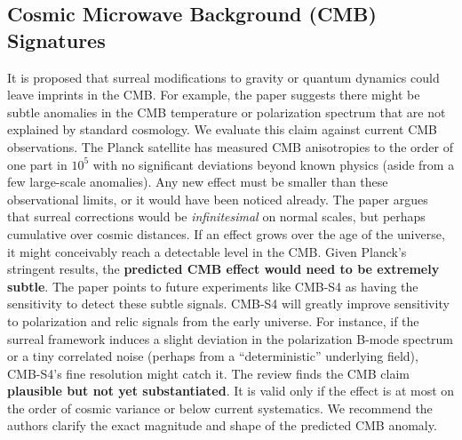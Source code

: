 \documentclass{article}
\begin{document}
\subsection*{Cosmic Microwave Background (CMB) Signatures}
It is proposed that surreal modifications to gravity or quantum dynamics could leave imprints in the CMB. For example, the paper suggests there might be subtle anomalies in the CMB temperature or polarization spectrum that are not explained by standard cosmology. We evaluate this claim against current CMB observations. The Planck satellite has measured CMB anisotropies to the order of one part in $10^5$ with no significant deviations beyond known physics (aside from a few large-scale anomalies). Any new effect must be smaller than these observational limits, or it would have been noticed already. The paper argues that surreal corrections would be \emph{infinitesimal} on normal scales, but perhaps cumulative over cosmic distances. If an effect grows over the age of the universe, it might conceivably reach a detectable level in the CMB. Given Planck’s stringent results, the \textbf{predicted CMB effect would need to be extremely subtle}. The paper points to future experiments like CMB-S4 as having the sensitivity to detect these subtle signals. CMB-S4 will greatly improve sensitivity to polarization and relic signals from the early universe. For instance, if the surreal framework induces a slight deviation in the polarization B-mode spectrum or a tiny correlated noise (perhaps from a “deterministic” underlying field), CMB-S4’s fine resolution might catch it. The review finds the CMB claim \textbf{plausible but not yet substantiated}. It is valid only if the effect is at most on the order of cosmic variance or below current systematics. We recommend the authors clarify the exact magnitude and shape of the predicted CMB anomaly.
\end{document}
